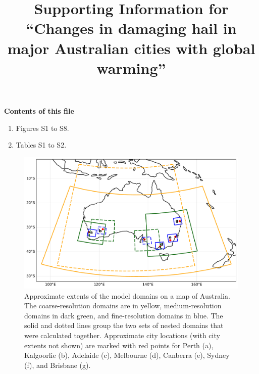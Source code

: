 \documentclass[draft,grl]{agutexSI2019}\usepackage[]{graphicx}\usepackage[]{xcolor}
\begin{document}
\title{Supporting Information for ``Changes in damaging hail in major Australian cities with global warming''}



\begin{article}

\noindent\textbf{Contents of this file}
\begin{enumerate}
    \item Figures S1 to S8.
    \item Tables S1 to S2.
\end{enumerate}

\clearpage



\end{article}

\clearpage

\begin{figure}[!h]
    \includegraphics[width=\textwidth]{figures/domains}
    \caption{Approximate extents of the model domains on a map of Australia. The coarse-resolution domains are in yellow, medium-resolution domains in dark green, and fine-resolution domains in blue. The solid and dotted lines group the two sets of nested domains that were calculated together. Approximate city locations (with city extents not shown) are marked with red points for Perth (a), Kalgoorlie (b), Adelaide (c), Melbourne (d), Canberra (e), Sydney (f), and Brisbane (g).}
    \label{fig:domains}
\end{figure}
\end{document}
